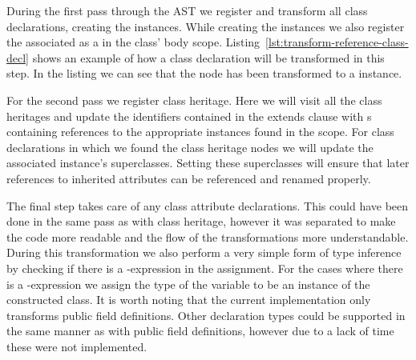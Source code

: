 During the first pass through the AST we register and transform all class declarations, creating the  instances.
While creating the  instances we also register the associated  as a  in the class' body scope.
Listing~\vref{lst:transform-reference-class-decl} shows an example of how a class declaration will be transformed in this step.
In the listing we can see that the  node has been transformed to a  instance.

For the second pass we register class heritage.
Here we will visit all the class heritages and update the identifiers contained in the extends clause with s containing references to the appropriate  instances found in the scope.
For class declarations in which we found the class heritage nodes we will update the associated  instance's superclasses.
Setting these superclasses will ensure that later references to inherited attributes can be referenced and renamed properly.

The final step takes care of any class attribute declarations.
This could have been done in the same pass as with class heritage, however it was separated to make the code more readable and the flow of the transformations more understandable.
During this transformation we also perform a very simple form of type inference by checking if there is a -expression in the assignment.
For the cases where there is a -expression we assign the type of the variable to be an instance of the constructed class.
It is worth noting that the current implementation only transforms public field definitions.
Other declaration types could be supported in the same manner as with public field definitions, however due to a lack of time these were not implemented.

